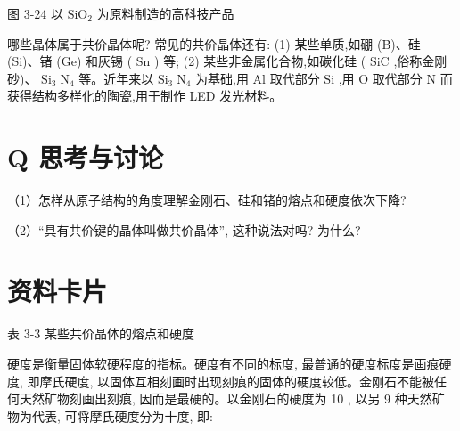 \documentclass[10pt]{article}
\begin{document}
图 3-24 以 \({\mathrm{{SiO}}}_{2}\) 为原料制造的高科技产品

哪些晶体属于共价晶体呢? 常见的共价晶体还有: (1) 某些单质,如硼 (B)、硅 (Si)、锗 (Ge) 和灰锡 ( \(\mathrm{{Sn}}\) ) 等; (2) 某些非金属化合物,如碳化硅 ( \(\mathrm{{SiC}}\) ,俗称金刚砂)、 \({\mathrm{{Si}}}_{3}{\mathrm{\;N}}_{4}\) 等。近年来以 \({\mathrm{{Si}}}_{3}{\mathrm{\;N}}_{4}\) 为基础,用 \(\mathrm{{Al}}\) 取代部分 \(\mathrm{{Si}}\) ,用 \(\mathrm{O}\) 取代部分 \(\mathrm{N}\) 而获得结构多样化的陶瓷,用于制作 LED 发光材料。

\section*{Q 思考与讨论}

（1）怎样从原子结构的角度理解金刚石、硅和锗的熔点和硬度依次下降?

（2）“具有共价键的晶体叫做共价晶体”, 这种说法对吗? 为什么?

\section*{资料卡片}

表 3-3 某些共价晶体的熔点和硬度

\begin{center}
\end{center}

硬度是衡量固体软硬程度的指标。硬度有不同的标度, 最普通的硬度标度是画痕硬度, 即摩氏硬度, 以固体互相刻画时出现刻痕的固体的硬度较低。金刚石不能被任何天然矿物刻画出刻痕, 因而是最硬的。以金刚石的硬度为 10 , 以另 9 种天然矿物为代表, 可将摩氏硬度分为十度, 即:

\begin{center}
\end{center}
\end{document}
